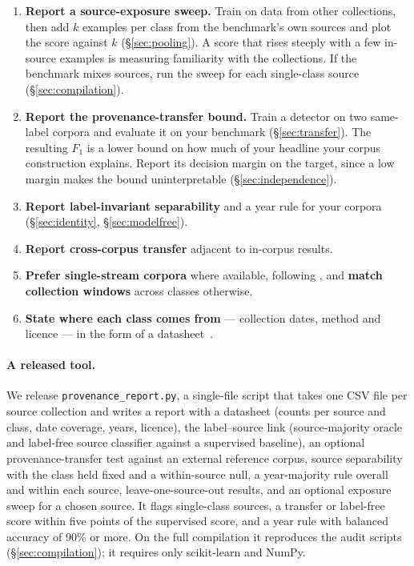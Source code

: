 \documentclass[twoside,11pt]{article}
\begin{document}
\begin{enumerate}\itemsep2pt
\item \textbf{Report a source-exposure sweep.} Train on data from other
collections, then add $k$ examples per class from the benchmark's own
sources and plot the score against $k$ (\S\ref{sec:pooling}). A score that
rises steeply with a few in-source examples is measuring familiarity with the
collections. If the benchmark mixes sources, run the sweep for each
single-class source (\S\ref{sec:compilation}).
\item \textbf{Report the provenance-transfer bound.} Train a detector on two
same-label corpora and evaluate it on your benchmark (\S\ref{sec:transfer}).
The resulting $F_1$ is a lower bound on how much of your headline your corpus
construction explains. Report its decision margin on the target, since a low
margin makes the bound uninterpretable (\S\ref{sec:independence}).
\item \textbf{Report label-invariant separability} and a year rule for your
corpora (\S\ref{sec:identity}, \S\ref{sec:modelfree}).
\item \textbf{Report cross-corpus transfer} adjacent to in-corpus results.
\item \textbf{Prefer single-stream corpora} where available, following \citet{cormack2005}, and \textbf{match collection windows} across classes
otherwise.
\item \textbf{State where each class comes from} --- collection dates,
method and licence --- in the form of a datasheet~\citep{gebru2021datasheets}.
\end{enumerate}

\paragraph{A released tool.} We release \texttt{provenance\_report.py}, a
single-file script that takes one CSV file per source collection and writes a
report with a datasheet (counts per source and class, date coverage, years,
licence), the label--source link (source-majority oracle and label-free
source classifier against a supervised baseline), an optional
provenance-transfer test against an external reference corpus,
source separability with the class held fixed and a within-source null, a
year-majority rule overall and within each source, leave-one-source-out
results, and an optional exposure sweep for a chosen source. It flags
single-class sources, a transfer or label-free score within five points of the
supervised score, and a year rule with balanced accuracy of 90\% or more. On
the full compilation it reproduces the audit scripts
(\S\ref{sec:compilation}); it requires only scikit-learn and NumPy.
\end{document}
